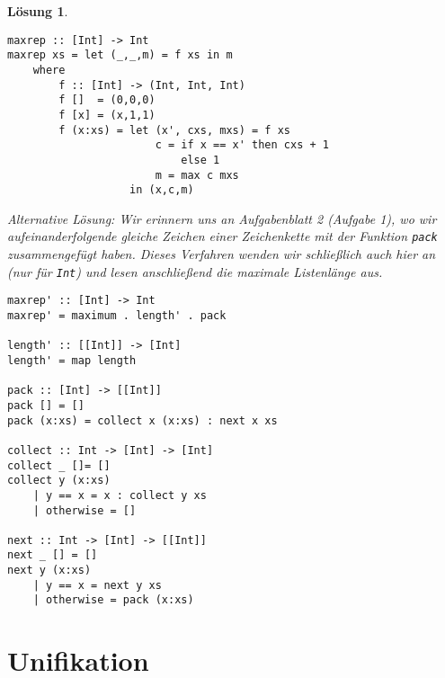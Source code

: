 \documentclass[ngerman,a4paper, 11pt]{scrartcl}
\theoremstyle{break}
\theoremstyle{nonumberplain}
\newtheorem{solution}{Lösung}
\begin{document}
\begin{solution}
\begin{lstlisting}[style=haskell]
maxrep :: [Int] -> Int
maxrep xs = let (_,_,m) = f xs in m
	where
		f :: [Int] -> (Int, Int, Int)
		f []  = (0,0,0)
		f [x] = (x,1,1)
		f (x:xs) = let (x', cxs, mxs) = f xs
		               c = if x == x' then cxs + 1
		                   else 1
		               m = max c mxs
		           in (x,c,m)
\end{lstlisting}
	
	Alternative Lösung: Wir erinnern uns an Aufgabenblatt 2 (Aufgabe 1), wo wir aufeinanderfolgende gleiche Zeichen einer Zeichenkette mit der Funktion \texttt{pack} zusammengefügt haben. Dieses Verfahren wenden wir schließlich auch hier an (nur für \texttt{Int}) und lesen anschließend die maximale Listenlänge aus.
	
\begin{lstlisting}[style=haskell]
maxrep' :: [Int] -> Int
maxrep' = maximum . length' . pack

length' :: [[Int]] -> [Int]
length' = map length

pack :: [Int] -> [[Int]]
pack [] = []
pack (x:xs) = collect x (x:xs) : next x xs

collect :: Int -> [Int] -> [Int]
collect _ []= []
collect y (x:xs)
	| y == x = x : collect y xs
	| otherwise = []

next :: Int -> [Int] -> [[Int]]
next _ [] = []
next y (x:xs)
	| y == x = next y xs
	| otherwise = pack (x:xs)
\end{lstlisting}
\end{solution}
	
	
\section{Unifikation}
\end{document}
